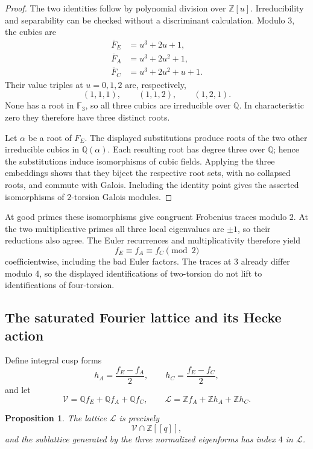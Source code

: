 \documentclass[11pt]{article}
\newtheorem{proposition}{Proposition}
\begin{document}
\begin{proof}
The two identities follow by polynomial division over
\(\mathbb Z[u]\). Irreducibility and separability can be checked
without a discriminant calculation. Modulo \(3\), the cubics are
\[
\begin{aligned}
\overline F_E&=u^3+2u+1,\\
\overline F_A&=u^3+2u^2+1,\\
\overline F_C&=u^3+2u^2+u+1.
\end{aligned}
\]
Their value triples at \(u=0,1,2\) are, respectively,
\[
(1,1,1),\qquad(1,1,2),\qquad(1,2,1).
\]
None has a root in \(\mathbb F_3\), so all three cubics
are irreducible over \(\mathbb Q\). In characteristic zero
they therefore have three distinct roots.

Let \(\alpha\) be a root of \(F_E\).
The displayed substitutions produce roots of the two other
irreducible cubics in \(\mathbb Q(\alpha)\).
Each resulting root has degree three over \(\mathbb Q\);
hence the substitutions induce isomorphisms of cubic fields.
Applying the three embeddings shows that they biject
the respective root sets, with no collapsed roots, and
commute with Galois. Including the identity point gives
the asserted isomorphisms of \(2\)-torsion Galois modules.
\end{proof}

At good primes these isomorphisms give congruent Frobenius
traces modulo \(2\). At the two multiplicative primes all
three local eigenvalues are \(\pm1\), so their reductions
also agree. The Euler recurrences and multiplicativity
therefore yield
\[
f_E\equiv f_A\equiv f_C\pmod2
\]
coefficientwise, including the bad Euler factors. The traces at 3 already differ modulo 4, so
the displayed identifications of two-torsion do not lift to
identifications of four-torsion.

\subsection{The saturated Fourier lattice and its Hecke action}

Define integral cusp forms
\[
h_A=\frac{f_E-f_A}{2},\qquad
h_C=\frac{f_E-f_C}{2},
\]
and let
\[
\mathcal V=\mathbb Q f_E+\mathbb Q f_A+\mathbb Q f_C,\qquad
\mathcal L=\mathbb Zf_A+\mathbb Zh_A+\mathbb Zh_C.
\]

\begin{proposition}
The lattice \(\mathcal L\) is precisely
\[
\mathcal V\cap\mathbb Z[[q]],
\]
and the sublattice generated by the three normalized
eigenforms has index \(4\) in \(\mathcal L\).
\end{proposition}
\end{document}

